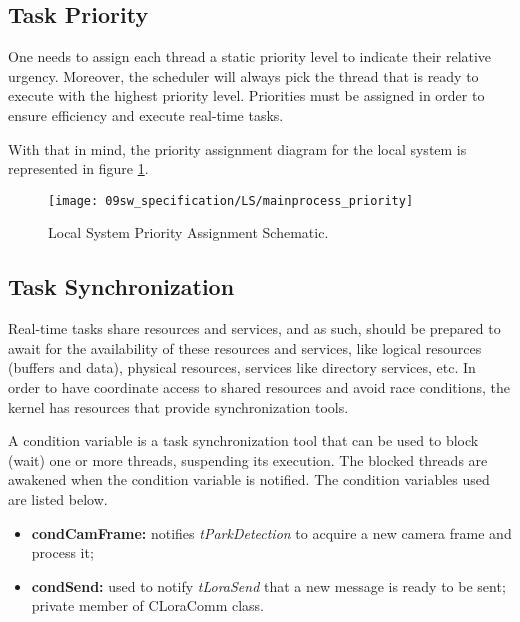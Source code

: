 \subsection{Task Priority}

One needs to assign each thread a static priority level to indicate their relative urgency. Moreover, the scheduler will always pick the thread that is ready to execute with the highest priority level. Priorities must be assigned in order to ensure efficiency and execute real-time tasks.

With that in mind, the priority assignment diagram for the local system is represented in figure \ref{fig:lst_priority}.

\begin{figure}[H]
	\centering
	\texttt{[image: 09sw\_specification/LS/mainprocess\_priority]}
	\caption{Local System Priority Assignment Schematic.}
	\label{fig:lst_priority}
\end{figure}

\subsection{Task Synchronization}
Real-time tasks share resources and services, and as such, should be prepared to await for the availability of these resources and services, like logical resources (buffers and data), physical resources, services like directory services, etc. In order to have coordinate access to shared resources and avoid race conditions, the kernel has resources that provide synchronization tools. 


A condition variable is a task synchronization tool that can be used to block (wait) one or more threads, suspending its execution. The blocked threads are awakened when the condition variable is notified. The condition variables used are listed below.

\begin{itemize}
	\item \textbf{condCamFrame:} notifies \textit{tParkDetection} to acquire a new camera frame and process it;
	\item \textbf{condSend:} used to notify \textit{tLoraSend} that a new message is ready to be sent; private member of CLoraComm class.
\end{itemize}

